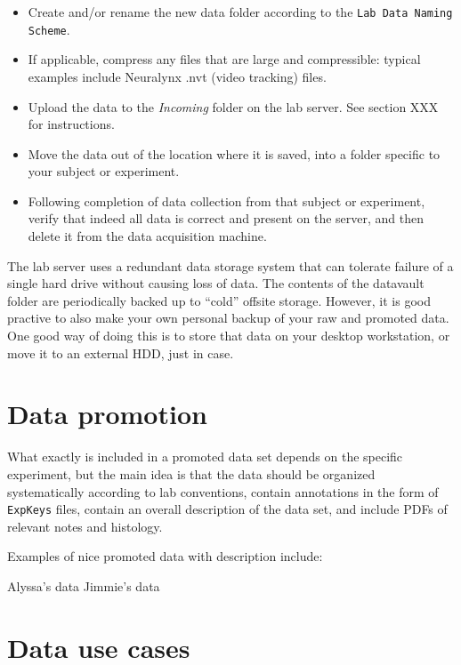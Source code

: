 \documentclass{tufte-book}
\newcommand{\doccls}[1]{\texttt{#1}}%
\begin{document}
\begin{itemize}
\item{Create and/or rename the new data folder according to the
  \doccls{Lab Data Naming Scheme}.}
\item{If applicable, compress any files that are large and
  compressible: typical examples include Neuralynx .nvt (video
  tracking) files.}
\item{Upload the data to the {\it Incoming} folder on the lab
  server. See section XXX for instructions.}
\item{Move the data out of the location where it is saved, into a
  folder specific to your subject or experiment.}
\item{Following completion of data collection from that subject or
  experiment, verify that indeed all data is correct and present on
  the server, and then delete it from the data acquisition
  machine.}
\end{itemize}

The lab server uses a redundant data storage system that can tolerate
failure of a single hard drive without causing loss of data. The
contents of the datavault folder are periodically backed up to
``cold'' offsite storage. However, it is good practive to also make
your own personal backup of your raw and promoted data. One good way
of doing this is to store that data on your desktop workstation, or
move it to an external HDD, just in case.

\section{Data promotion}

What exactly is included in a promoted data set depends on the
specific experiment, but the main idea is that the data should be
organized systematically according to lab conventions, contain
annotations in the form of \doccls{ExpKeys} files, contain an overall
description of the data set, and include PDFs of relevant notes and
histology.

Examples of nice promoted data with description include:

Alyssa's data
Jimmie's data

\section{Data use cases}
\end{document}
